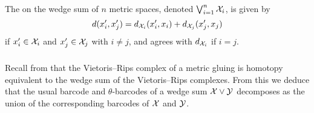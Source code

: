 The  on the wedge sum of $n$ metric spaces, denoted $\bigvee_{i=1}^n \mathcal{X}_i$, is given by
\[
d(x_i', x_j') = d_{\mathcal{X}_i}(x_i', x_i) + d_{\mathcal{X}_j}(x_j', x_j)
\]
if $x_i' \in \mathcal{X}_i$ and $x_j' \in \mathcal{X}_j$ with $i \neq j$, and agrees with $d_{\mathcal{X}_i}$ if $i = j$.


\subsubsection{}\label{prop:wedge sum}
Recall from \cite[Proposition 3.7]{adamaszek2020homotopy} that the Vietoris--Rips complex of a metric gluing is homotopy equivalent to the wedge sum of the Vietoris--Rips complexes.
From this we deduce that the usual barcode and $\theta$-barcodes of a wedge sum $\mathcal{X} \vee \mathcal{Y}$ decomposes as the union of the corresponding barcodes of $\mathcal{X}$ and $\mathcal{Y}$.


%	

